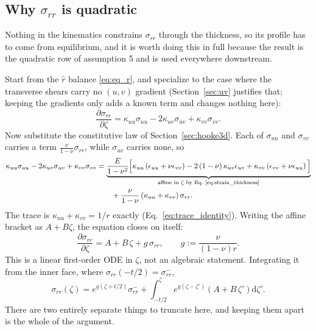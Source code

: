 \documentclass[11pt]{article}
\begin{document}
\subsection{Why \texorpdfstring{$\sigma_{rr}$}{sigma-rr} is quadratic}
\label{sec:srr_quadratic}
Nothing in the kinematics constrains $\sigma_{rr}$ through the thickness, so its
profile has to come from equilibrium, and it is worth doing this in full because
the result is the quadratic row of assumption 5 and is used everywhere
downstream.

Start from the $\hat r$ balance \eqref{eq:eq_r}, and specialize to the case where
the transverse shears carry no $(u,v)$ gradient (Section~\ref{sec:uv} justifies
that; keeping the gradients only adds a known term and changes nothing here):
\begin{equation}\label{eq:srr_step1}
    \frac{\partial \sigma_{rr}}{\partial \zeta}
      = \kappa_{uu}\sigma_{uu} - 2\kappa_{uv}\sigma_{uv}
        + \kappa_{vv}\sigma_{vv}.
\end{equation}
Now substitute the constitutive law of Section~\ref{sec:hooke3d}. Each of
$\sigma_{uu}$ and $\sigma_{vv}$ carries a term
$\frac{\nu}{1-\nu}\sigma_{rr}$, while $\sigma_{uv}$ carries none, so
\begin{equation}\label{eq:srr_step2}
    \begin{aligned}
    \kappa_{uu}\sigma_{uu} - 2\kappa_{uv}\sigma_{uv} + \kappa_{vv}\sigma_{vv}
    &= \underbrace{\frac{E}{1-\nu^{2}}\Big[\kappa_{uu}
        \left(\epsilon_{uu}+\nu\epsilon_{vv}\right)
        - 2\left(1-\nu\right)\kappa_{uv}\epsilon_{uv}
        + \kappa_{vv}\left(\epsilon_{vv}+\nu\epsilon_{uu}\right)\Big]}
        _{\text{affine in }\zeta\text{ by Eq.~\eqref{eq:strain_thickness}}}\\
    &\qquad + \frac{\nu}{1-\nu}
        \left(\kappa_{uu}+\kappa_{vv}\right)\sigma_{rr}.
    \end{aligned}
\end{equation}
The trace is $\kappa_{uu}+\kappa_{vv} = 1/r$ exactly
(Eq.~\ref{eq:trace_identity}). Writing the affine bracket as $A + B\zeta$, the
equation closes on itself:
\begin{equation}\label{eq:srr_ode}
    \boxed{\;\frac{\partial \sigma_{rr}}{\partial \zeta}
      = A + B\,\zeta + g\,\sigma_{rr},
    \qquad
    g := \frac{\nu}{\left(1-\nu\right)r}.\;}
\end{equation}
This is a linear first-order ODE in $\zeta$, not an algebraic statement.
Integrating it from the inner face, where $\sigma_{rr}\left(-t/2\right)
= \sigma_{rr}^{-}$,
\begin{equation}\label{eq:srr_exact}
    \sigma_{rr}\left(\zeta\right)
      = e^{g\left(\zeta+t/2\right)}\sigma_{rr}^{-}
      + \int_{-t/2}^{\zeta}
        e^{g\left(\zeta-\zeta'\right)}
        \left(A + B\,\zeta'\right)\mathrm d\zeta'.
\end{equation}
There are two entirely separate things to truncate here, and keeping them apart
is the whole of the argument.
\end{document}
